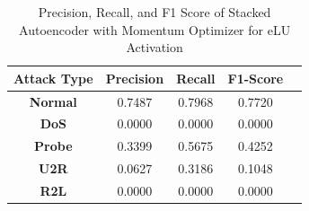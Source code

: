 \documentclass[12pt, a4paper]{report}
\begin{document}
\begin{table}[ht]
\centering
\captionsetup{justification=centering,margin=2cm}
\begin{tabular}{|c|c|c|c|c|}
\hline
\multicolumn{1}{|c|}{\textbf{Attack Type}} & \multicolumn{1}{c|}{\textbf{Precision}} & \multicolumn{1}{c|}{\textbf{Recall}} & \multicolumn{1}{c|}{\textbf{F1-Score}} \\ \hline
\textbf{Normal}        & 0.7487                                   & 0.7968                                & 0.7720                                                                  \\ \hline
\textbf{DoS}           & 0.0000                                  & 0.0000                                &  0.0000                                                                    \\ \hline
\textbf{Probe}         & 0.3399                                  & 0.5675                                & 0.4252                                                                  \\ \hline
\textbf{U2R}           & 0.0627                                    & 0.3186                                & 0.1048                                                                   \\ \hline
\textbf{R2L}           & 0.0000                                      & 0.0000                                   & 0.0000                                                            \\ \hline         \end{tabular}
\caption{Precision, Recall, and F1 Score of Stacked Autoencoder with Momentum Optimizer for eLU Activation}
\label{prf1_mom_elu_auto}
\end{table}
\clearpage
\end{document}
